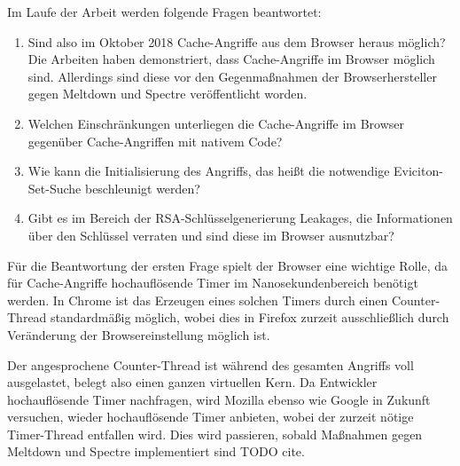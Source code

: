 Im Laufe der Arbeit werden folgende Fragen beantwortet:

\begin{enumerate}
\item Sind also im Oktober 2018 Cache-Angriffe aus dem Browser heraus möglich?
Die Arbeiten \cite{TheSpyInTheSandbox,DriveByPaper,ASLROnTheLine} haben demonstriert, dass Cache-Angriffe im Browser möglich sind.
Allerdings sind diese vor den Gegenmaßnahmen der Browserhersteller gegen Meltdown und Spectre veröffentlicht worden.


\item Welchen Einschränkungen unterliegen die Cache-Angriffe im Browser gegenüber Cache-Angriffen mit nativem Code?

\item Wie kann die Initialisierung des Angriffs, das heißt die notwendige Eviciton-Set-Suche beschleunigt werden?

\item Gibt es im Bereich der RSA-Schlüsselgenerierung Leakages, die Informationen über den Schlüssel verraten und sind diese im Browser ausnutzbar?
\end{enumerate}


Für die Beantwortung der ersten Frage spielt der Browser eine wichtige Rolle, da für Cache-Angriffe hochauflösende Timer im Nanosekundenbereich benötigt werden.
In Chrome ist das Erzeugen eines solchen Timers durch einen Counter-Thread standardmäßig möglich, wobei dies in Firefox zurzeit ausschließlich durch Veränderung der Browsereinstellung möglich ist.

Der angesprochene Counter-Thread ist während des gesamten Angriffs voll ausgelastet, belegt also einen ganzen virtuellen Kern.
Da Entwickler hochauflösende Timer nachfragen, wird Mozilla ebenso wie Google in Zukunft versuchen, wieder hochauflösende Timer anbieten, wobei der zurzeit nötige Timer-Thread entfallen wird.
Dies wird passieren, sobald Maßnahmen gegen Meltdown und Spectre implementiert sind TODO cite.

\par\medskip 


